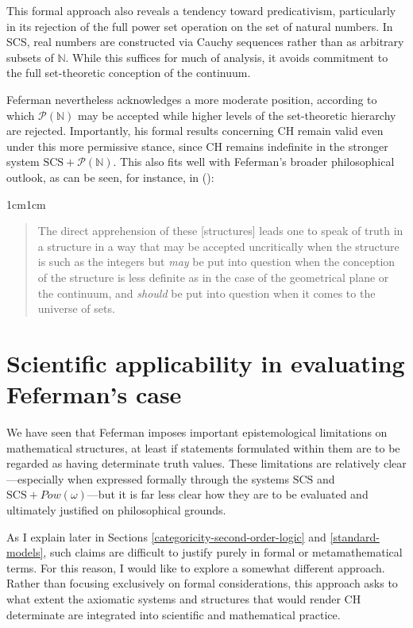 \documentclass[11pt,a4paper]{article}
\theoremstyle{plain}
\begin{document}
This formal approach also reveals a tendency toward predicativism, particularly in its rejection of the full power set operation on the set of natural numbers. In SCS, real numbers are constructed via Cauchy sequences rather than as arbitrary subsets of $\mathbb{N}$. While this suffices for much of analysis, it avoids commitment to the full set-theoretic conception of the continuum.

Feferman nevertheless acknowledges a more moderate position, according to which $\mathcal{P}(\mathbb{N})$ may be accepted while higher levels of the set-theoretic hierarchy are rejected. Importantly, his formal results concerning CH remain valid even under this more permissive stance, since CH remains indefinite in the stronger system $\mathrm{SCS} + \mathcal{P}(\mathbb{N})$. This also fits well with Feferman's broader philosophical outlook, as can be seen, for instance, in (\citeyear[p.~22]{Feferman2014ConceptualStruc}):

\begin{adjustwidth}{1cm}{1cm}
\begin{quote}
\small
The direct apprehension of these [structures] leads one to speak of truth in a structure in a way that may be accepted uncritically when the structure is such as the integers but \textit{may} be put into question when the conception of the structure is less definite as in the case of the geometrical plane or the continuum, and \textit{should} be put into question when it comes to the universe of sets.
\end{quote}
\end{adjustwidth}


\section{Scientific applicability in evaluating Feferman's case}
\label{science-applicability}

We have seen that Feferman imposes important epistemological limitations on mathematical structures, at least if statements formulated within them are to be regarded as having determinate truth values. These limitations are relatively clear—especially when expressed formally through the systems $\mathrm{SCS}$ and $\mathrm{SCS} + Pow(\omega)$—but it is far less clear how they are to be evaluated and ultimately justified on philosophical grounds.

As I explain later in Sections \ref{categoricity-second-order-logic} and \ref{standard-models}, such claims are difficult to justify purely in formal or metamathematical terms. For this reason, I would like to explore a somewhat different approach. Rather than focusing exclusively on formal considerations, this approach asks to what extent the axiomatic systems and structures that would render CH determinate are integrated into scientific and mathematical practice.
\end{document}
